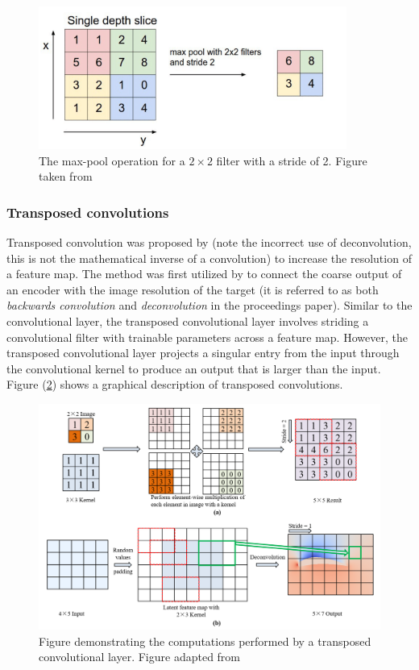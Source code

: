 \documentclass[../main/thesis.tex]{subfiles}
\begin{document}
\begin{figure}
    \centering
    \includegraphics[width=0.9\textwidth]{The-MaxPool-operation}
    \caption{\label{fig:maxpool}The max-pool operation for a $2 \times 2$ filter with a stride of 2. Figure taken from \protect\citep{MihaiDaniel2020}}
\end{figure}

\subsubsection{Transposed convolutions}
\label{sec:tconv}
Transposed convolution was proposed by \citet{Zeiler2010} (note the incorrect use of deconvolution, this is not the mathematical inverse of a convolution) to increase the resolution of a feature map. The method was first utilized by \citet{Long2015} to connect the coarse output of an encoder with the image resolution of the target (it is referred to as both \textit{backwards convolution} and \textit{deconvolution} in the proceedings paper). Similar to the convolutional layer, the transposed convolutional layer involves striding a convolutional filter with trainable parameters across a feature map. However, the transposed convolutional layer projects a singular entry from the input through the convolutional kernel to produce an output that is larger than the input. Figure (\ref{fig:tconv}) shows a graphical description of transposed convolutions.

\begin{figure}
    \centering
    \includegraphics[trim = {0 5.125cm 0 0}, clip, width = \textwidth]{applsci-12-12075-g004}
    \caption{\label{fig:tconv}Figure demonstrating the computations performed by a transposed convolutional layer. Figure adapted from \protect\citep{Wu2022}}
\end{figure}
\end{document}
